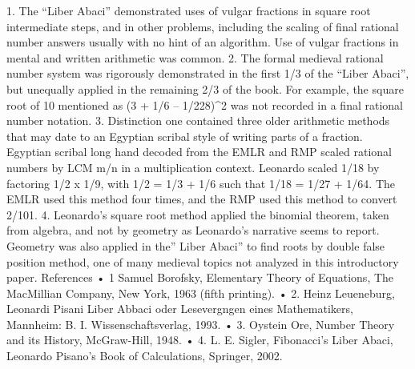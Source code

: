 \documentclass[12pt]{article}
\begin{document}
1.	The “Liber Abaci” demonstrated uses of vulgar fractions in square root intermediate steps, and in other problems, including the scaling of final rational number answers usually with no hint of an algorithm. Use of vulgar fractions in mental and written arithmetic was common.
2.	The formal medieval rational number system was rigorously demonstrated in the first 1/3 of the “Liber Abaci”, but unequally applied in the remaining 2/3 of the book.  For example, the square root of 10 mentioned as (3 + 1/6 – 1/228)^2 was not recorded in a final rational number notation.
3.	Distinction one contained three older arithmetic methods that may date to an Egyptian scribal style of writing parts of a fraction.  Egyptian scribal long hand decoded from the EMLR and RMP  scaled rational numbers by LCM m/n in a multiplication context. Leonardo scaled 1/18 by factoring 1/2 x 1/9, with 1/2 = 1/3 + 1/6 such that 1/18 = 1/27 + 1/64. The EMLR used this method four times, and the RMP used this method to convert 2/101.
4.	Leonardo’s square root method applied the binomial theorem, taken from algebra, and not by geometry as Leonardo’s narrative seems to report. Geometry was also applied in the” Liber Abaci”  to find roots by double false position method,  one of many medieval topics not analyzed in this introductory paper.
References
•	1 Samuel Borofsky, Elementary Theory of Equations, The MacMillian Company, New York, 1963 (fifth printing). 
•	2. Heinz Leueneburg, Leonardi Pisani Liber Abbaci oder Lesevergngen eines Mathematikers, Mannheim: B. I. Wissenschaftsverlag, 1993. 
•	3. Oystein Ore, Number Theory and its History, McGraw-Hill, 1948. 
•	4.  L. E. Sigler, Fibonacci’s Liber Abaci, Leonardo Pisano’s Book of Calculations, Springer, 2002. 
 
\end{document}
